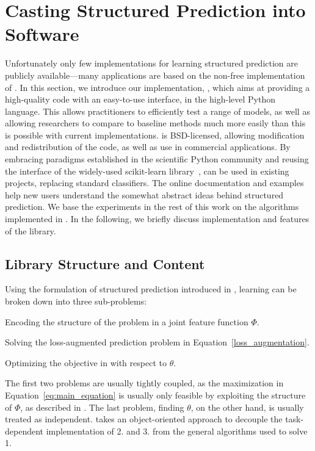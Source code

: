 \section{Casting Structured Prediction into Software}\label{sec:pystruct}

Unfortunately only few implementations for learning structured prediction are
publicly available---many applications are based on the non-free implementation
of \citet{joachims2009cutting}.
In this section, we introduce our implementation, \pystruct, which aims at
providing a high-quality code with an easy-to-use interface, in the high-level
Python language. This allows practitioners to efficiently test a range of
models, as well as allowing researchers to compare to baseline methods much
more easily than this is possible with current implementations. \pystruct is
BSD-licensed, allowing modification and redistribution of the code, as well as
use in commercial applications.  By embracing paradigms established in the
scientific Python community and reusing the interface of the widely-used {\sc
scikit-learn} library~\citep{pedregosa2011scikit}, \pystruct can be used in
existing projects, replacing standard classifiers. The online documentation and
examples help new users understand the somewhat abstract ideas behind
structured prediction.
We base the experiments in the rest of this work on the algorithms
implemented in \pystruct. In the following, we briefly discuss implementation
and features of the \pystruct library.

\subsection{Library Structure and Content}
Using the formulation of structured prediction introduced in
, learning can be broken down into three
sub-problems:
\begin{enumerate*}
    \item Encoding the structure of the problem in a joint feature function $\Phi$.
    \item Solving the loss-augmented prediction problem in Equation~\eqref{loss_augmentation}.
    \item Optimizing the objective in  with respect to $\theta$.
\end{enumerate*}
The first two problems are usually tightly coupled, as the maximization in
Equation~\ref{eq:main_equation} is usually only feasible by exploiting the
structure of $\Phi$, as described in . The last problem,
finding $\theta$, on the other hand, is usually treated as independent.
\pystruct takes an object-oriented approach to decouple the task-dependent
implementation of 2. and 3. from the general algorithms used to solve 1.

